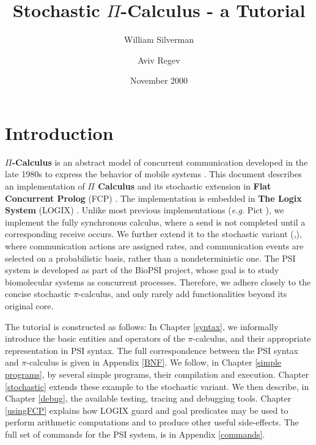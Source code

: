 \title{Stochastic $\Pi$-Calculus - a Tutorial}
\author{William Silverman \and Aviv Regev}
\date{November 2000}
 
\maketitle

\tableofcontents

\chapter{Introduction}
{\bf $\Pi$-Calculus} is an abstract model of concurrent communication
developed in the late 1980s to express the behavior of mobile systems
\cite{Milner99}.  This document describes an implementation of
{\bf $\Pi$ Calculus} and its stochastic extension in {\bf Flat
Concurrent Prolog} (FCP) \cite{Shapiro87a}.  The implementation is
embedded in {\bf The Logix System} (LOGIX)
\cite{logix:user-man,logix:user-man-supp}. Unlike most previous
implementations ({\em e.g.} Pict \cite{PT99}), we implement the fully
synchronous calculus, where a send is not completed until a
corresponding receive occurs.  We further extend it to the stochastic
variant (\cite{Pri95},\cite{RPSS}), where communication actions are
assigned rates, and communication events are selected on a
probabilistic basis, rather than a nondeterministic one.  The PSI
system is developed as part of the BioPSI project, whose goal is to
study biomolecular systems as concurrent processes. Therefore, we
adhere closely to the concise stochastic $\pi$-calculus, and only rarely
add functionalities beyond its original core.

The tutorial is constructed as follows: In Chapter \ref{syntax}, we
informally introduce the basic entities and operators of the
$\pi$-calculus, and their appropriate representation in PSI syntax. The
full correspondence between the PSI syntax and $\pi$-calculus is given in
Appendix \ref{BNF}.  We follow, in Chapter \ref{simple programs}, by
several simple programs, their compilation and execution. Chapter
\ref{stochastic} extends these example to the stochastic variant.  We
then describe, in Chapter \ref{debug}, the available testing,
tracing and debugging tools. Chapter \ref{usingFCP} explains how
LOGIX guard and goal predicates may be used to perform arithmetic
computations and to produce other useful side-effects.
The full set of commands for the PSI system, is in Appendix \ref{commands}.

